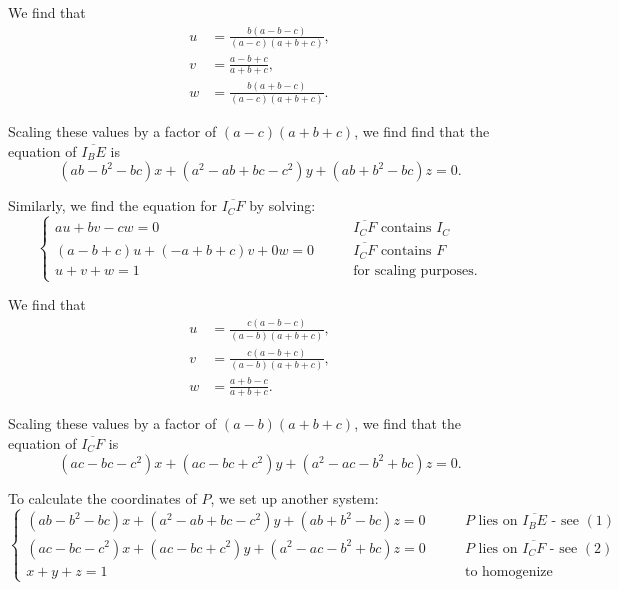 \documentclass[12pt]{article}
\begin{document}
\begin{solution}{5}
    We find that
    \begin{align*}
        u &= \frac{b(a-b-c)}{(a-c)(a+b+c)}, \\
        v &= \frac{a-b+c}{a+b+c}, \\
        w &= \frac{b(a+b-c)}{(a-c)(a+b+c)}.
    \end{align*}
    
    Scaling these values by a factor of $(a-c)(a+b+c)$, we find find that the equation of $\overline{I_BE}$ is
    \begin{equation*} \tag{1}
        (ab-b^2-bc)x+(a^2-ab+bc-c^2)y+(ab+b^2-bc)z = 0.
    \end{equation*}
    
    Similarly, we find the equation for $\overline{I_CF}$ by solving:
    \begin{equation*}
        \begin{cases}
            au+bv-cw = 0 &\qquad\text{$\overline{I_CF}$ contains $I_C$} \\
            (a-b+c)u+(-a+b+c)v+0w = 0 &\qquad\text{$\overline{I_CF}$ contains $F$} \\
            u+v+w=1 &\qquad\text{for scaling purposes}.
        \end{cases}
    \end{equation*}
    
    We find that
    \begin{align*}
        u &= \frac{c(a-b-c)}{(a-b)(a+b+c)}, \\
        v &= \frac{c(a-b+c)}{(a-b)(a+b+c)}, \\
        w &= \frac{a+b-c}{a+b+c}.
    \end{align*}
    
    Scaling these values by a factor of $(a-b)(a+b+c)$, we find that the equation of $\overline{I_CF}$ is
    \begin{equation*} \tag{2}
        (ac-bc-c^2)x+(ac-bc+c^2)y+(a^2-ac-b^2+bc)z=0.
    \end{equation*}
    
    To calculate the coordinates of $P$, we set up another system:
    \begin{equation*}
        \begin{cases}
            (ab-b^2-bc)x+(a^2-ab+bc-c^2)y+(ab+b^2-bc)z = 0 &\qquad\text{$P$ lies on $\overline{I_BE}$ - see $(1)$} \\
            (ac-bc-c^2)x+(ac-bc+c^2)y+(a^2-ac-b^2+bc)z = 0 &\qquad\text{$P$ lies on $\overline{I_CF}$ - see $(2)$} \\
            x+y+z = 1 &\qquad\text{to homogenize coordinates.}
        \end{cases}
    \end{equation*}
    

\end{solution}
\end{document}
